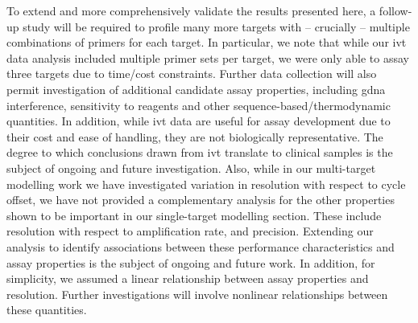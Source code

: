 \documentclass[../thesis.tex]{subfiles}
\begin{document}
To extend and more comprehensively validate the results presented here, a follow-up study will be required to profile many more targets with -- crucially -- multiple combinations of primers for each target. In particular, we note that while our \gls{ivt}  data analysis included multiple primer sets per target, we were only able to assay three targets due to time/cost constraints. Further data collection will also permit investigation of additional candidate assay properties, including \gls{gdna} interference, sensitivity to reagents and other sequence-based/thermodynamic quantities. In addition, while \gls{ivt}  data are useful for assay development due to their cost and ease of handling, they are not biologically representative. The degree to which conclusions drawn from \gls{ivt}  translate to  clinical samples is the subject of ongoing and future investigation. Also, while in our multi-target modelling work we have investigated variation in resolution with respect to cycle offset, we have not provided a complementary analysis for the other properties shown to be important in our single-target modelling section. These include resolution with respect to amplification rate, and precision. Extending our analysis to identify associations between these performance characteristics and assay properties is the subject of ongoing and future work. In addition, for simplicity, we assumed a linear relationship between assay properties and resolution. Further investigations will involve nonlinear relationships between these quantities.


\end{document}
